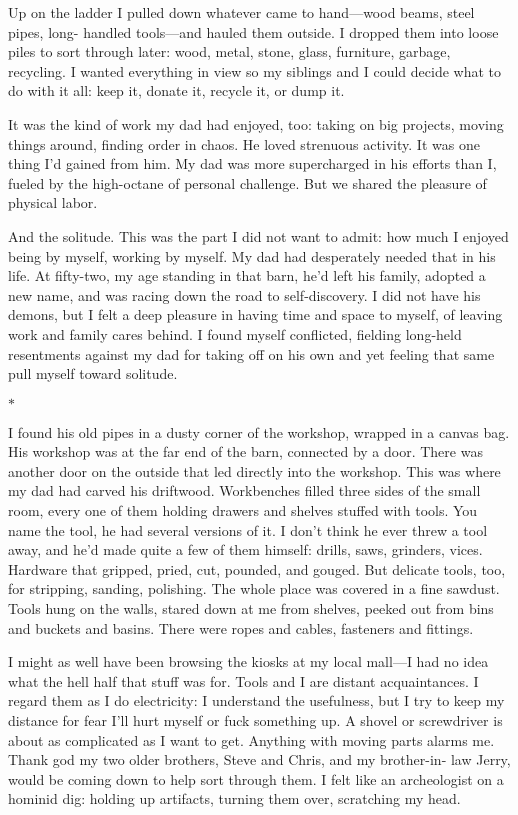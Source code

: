 \documentclass[12pt]{book}
\begin{document}
Up on the ladder I pulled down whatever came to hand---wood beams, steel pipes, long- handled tools---and hauled them outside. I dropped them into loose piles to sort through later: wood, metal, stone, glass, furniture, garbage, recycling. I wanted everything in view so my siblings and I could decide what to do with it all: keep it, donate it, recycle it, or dump it.

It was the kind of work my dad had enjoyed, too: taking on big projects, moving things around, finding order in chaos. He loved strenuous activity. It was one thing I'd gained from him. My dad was more supercharged in his efforts than I, fueled by the high-octane of personal challenge. But we shared the pleasure of physical labor.

And the solitude. This was the part I did not want to admit: how much I enjoyed being by myself, working by myself. My dad had desperately needed that in his life. At fifty-two, my age standing in that barn, he'd left his family, adopted a new name, and was racing down the road to self-discovery. I did not have his demons, but I felt a deep pleasure in having time and space to myself, of leaving work and family cares behind. I found myself conflicted, fielding long-held resentments against my dad for taking off on his own and yet feeling that same pull myself toward solitude.

\begin{center}$*$\end{center}

I found his old pipes in a dusty corner of the workshop, wrapped in a canvas bag. His workshop was at the far end of the barn, connected by a door. There was another door on the outside that led directly into the workshop. This was where my dad had carved his driftwood. Workbenches filled three sides of the small room, every one of them holding drawers and shelves stuffed with tools. You name the tool, he had several versions of it. I don't think he ever threw a tool away, and he'd made quite a few of them himself: drills, saws, grinders, vices. Hardware that gripped, pried, cut, pounded, and gouged. But delicate tools, too, for stripping, sanding, polishing. The whole place was covered in a fine sawdust. Tools hung on the walls, stared down at me from shelves, peeked out from bins and buckets and basins. There were ropes and cables, fasteners and fittings.

I might as well have been browsing the kiosks at my local mall---I had no idea what the hell half that stuff was for. Tools and I are distant acquaintances. I regard them as I do electricity: I understand the usefulness, but I try to keep my distance for fear I'll hurt myself or fuck something up. A shovel or screwdriver is about as complicated as I want to get. Anything with moving parts alarms me. Thank god my two older brothers, Steve and Chris, and my brother-in- law Jerry, would be coming down to help sort through them. I felt like an archeologist on a hominid dig: holding up artifacts, turning them over, scratching my head.
\end{document}
